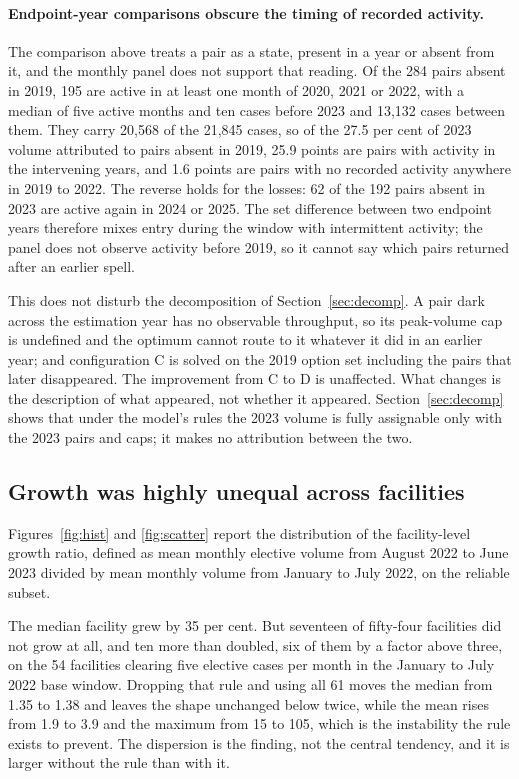 \paragraph{Endpoint-year comparisons obscure the timing of recorded activity.}
The comparison above treats a pair as a state, present in a year or absent from
it, and the monthly panel does not support that reading. Of the 284 pairs absent
in 2019, 195 are active in at least one month of 2020, 2021 or 2022, with a
median of five active months and ten cases before 2023 and 13{,}132 cases
between them. They carry 20{,}568 of the 21{,}845 cases, so of the 27.5 per cent
of 2023 volume attributed to pairs absent in 2019, 25.9 points are pairs
with activity in the intervening years, and 1.6 points are pairs
with no recorded activity anywhere in 2019 to 2022. The reverse holds for the
losses: 62 of the 192 pairs absent in 2023 are active again in 2024 or 2025.
The set difference between two endpoint years therefore mixes entry during the
window with intermittent activity; the panel does not observe activity before
2019, so it cannot say which pairs returned after an earlier spell.

This does not disturb the decomposition of Section~\ref{sec:decomp}. A pair dark
across the estimation year has no observable throughput, so its peak-volume cap is
undefined and the optimum cannot route to it whatever it did in an earlier year;
and configuration C is solved on the 2019 option set including the pairs that
later disappeared. The improvement from C to D is unaffected. What changes is the
description of what appeared, not whether it appeared.
Section~\ref{sec:decomp} shows that under the model's rules the 2023 volume is fully assignable only with the 2023 pairs and caps; it makes no attribution between the two.


\subsection{Growth was highly unequal across facilities}

Figures~\ref{fig:hist} and \ref{fig:scatter} report the distribution of the
facility-level growth ratio, defined as mean monthly elective volume from
August 2022 to June 2023 divided by mean monthly volume from January to July
2022, on the reliable subset.

The median facility grew by 35 per cent. But seventeen of fifty-four
facilities did not grow at all, and ten more than doubled, six of them by a
factor above three, on the 54 facilities clearing five elective cases per month
in the January to July 2022 base window. Dropping that rule and using all 61
moves the median from 1.35 to 1.38 and leaves the shape unchanged below twice,
while the mean rises from 1.9 to 3.9 and the maximum from 15 to 105, which is the
instability the rule exists to prevent. The dispersion is the finding, not the
central tendency, and it is larger without the rule than with it.

